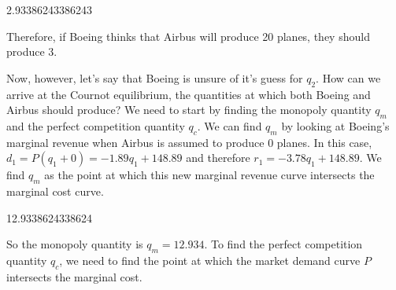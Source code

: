 \documentclass[letterpaper,10pt,english]{jupyterBook}
\begin{document}
\begin{sphinxVerbatim}[commandchars=\\\{\}]
  
  
      

 
\end{sphinxVerbatim}

\begin{sphinxVerbatim}[commandchars=\\\{\}]
2.93386243386243
\end{sphinxVerbatim}

\sphinxAtStartPar
Therefore, if Boeing thinks that Airbus will produce 20 planes, they should produce 3.

\sphinxAtStartPar
Now, however, let’s say that Boeing is unsure of it’s guess for \(q_2\). How can we arrive at the  Cournot equilibrium, the quantities at which both Boeing and Airbus should produce? We need to start by finding the monopoly quantity \(q_m\) and the perfect competition quantity \(q_c\). We can find \(q_m\) by looking at Boeing’s marginal revenue when Airbus is assumed to produce 0 planes. In this case, \(d_1 = P(q_1 + 0) = -1.89 q_1 + 148.89\) and therefore \(r_1 = -3.78 q_1 + 148.89\). We find \(q_m\) as the point at which this new marginal revenue curve intersects the marginal cost curve.

\begin{sphinxVerbatim}[commandchars=\\\{\}]
      
   
\end{sphinxVerbatim}

\begin{sphinxVerbatim}[commandchars=\\\{\}]
12.9338624338624
\end{sphinxVerbatim}

\sphinxAtStartPar
So the monopoly quantity is \(q_m = 12.934\). To find the perfect competition quantity \(q_c\), we need to find the point at which the market demand curve \(P\) intersects the marginal cost.
\end{document}
